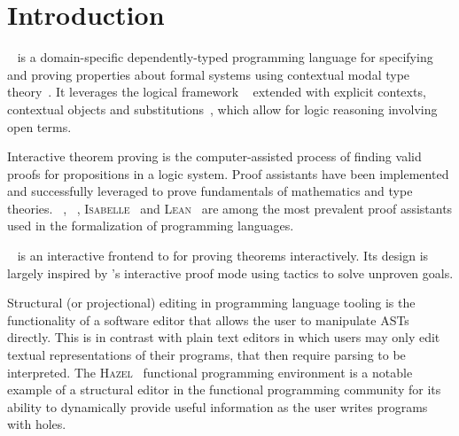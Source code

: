 \chapter{Introduction}





\Beluga~\cite{pientka2010beluga} is a domain-specific dependently-typed programming language for specifying and proving properties about formal systems using contextual modal type theory~\cite{nanevski2008contextual}.
It leverages the logical framework \LF~\cite{harper1993framework} extended with explicit contexts, contextual objects and substitutions~\cite{DBLP:journals/corr/abs-1009-2789, cave2013first}, which allow for logic reasoning involving open terms.


Interactive theorem proving is the computer-assisted process of finding valid proofs for propositions in a logic system.
Proof assistants have been implemented and successfully leveraged to prove fundamentals of mathematics and type theories.
\Agda~\cite{clffolp}, \Coq~\cite{Coq, bertot2013interactive}, \textsc{Isabelle}~\cite{nipkow2002isabelle} and \textsc{Lean}~\cite{lean4} are among the most prevalent proof assistants used in the formalization of programming languages.

\Harpoon~\cite{errington2021harpoon} is an interactive frontend to \Beluga for proving theorems interactively.
Its design is largely inspired by \Coq's interactive proof mode using tactics to solve unproven goals.

Structural (or projectional) editing in programming language tooling is the functionality of a software editor that allows the user to manipulate \acp{AST} directly.
This is in contrast with plain text editors in which users may only edit textual representations of their programs, that then require parsing to be interpreted.
The \textsc{Hazel}~\cite{omar2017hazelnut, omar2019live} functional programming environment is a notable example of a structural editor in the functional programming community for its ability to dynamically provide useful information as the user writes programs with holes.

